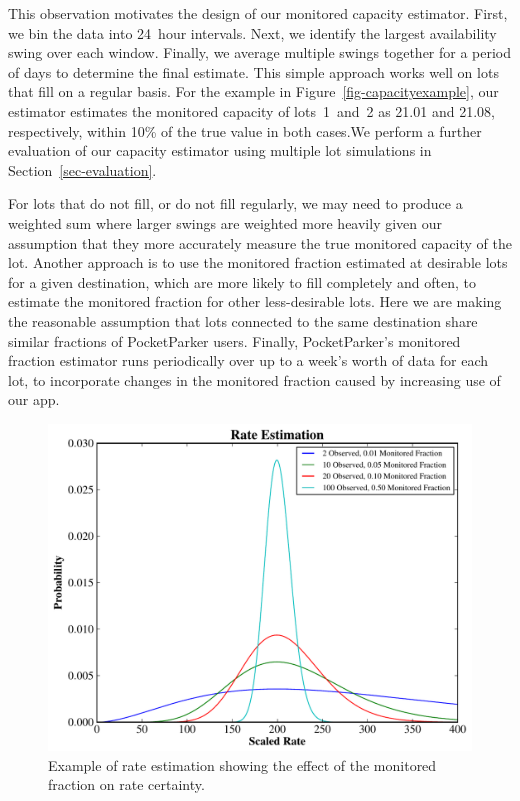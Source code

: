 This observation motivates the design of our monitored capacity estimator.
First, we bin the data into 24~hour intervals. Next, we identify the largest
availability swing over each window. Finally, we average multiple swings
together for a period of days to determine the final estimate. This simple
approach works well on lots that fill on a regular basis. For the example in
Figure~\ref{fig-capacityexample}, our estimator estimates the monitored
capacity of lots~1~and~2 as 21.01 and 21.08, respectively, within 10\% of the
true value in both cases.We perform a further evaluation of our capacity
estimator using multiple lot simulations in Section~\ref{sec-evaluation}.

For lots that do not fill, or do not fill regularly, we may need to produce a
weighted sum where larger swings are weighted more heavily given our
assumption that they more accurately measure the true monitored capacity of
the lot. Another approach is to use the monitored fraction estimated at
desirable lots for a given destination, which are more likely to fill
completely and often, to estimate the monitored fraction for other
less-desirable lots. Here we are making the reasonable assumption that lots
connected to the same destination share similar fractions of PocketParker
users. Finally, PocketParker's monitored fraction estimator runs periodically
over up to a week's worth of data for each lot, to incorporate changes in the
monitored fraction caused by increasing use of our app.

\begin{figure}
\centering
\includegraphics[width=\columnwidth]{./figures/rates.pdf}

\caption{Example of rate estimation showing the effect of the monitored
fraction on rate certainty.}

\label{fig-rateexample}
\end{figure}

